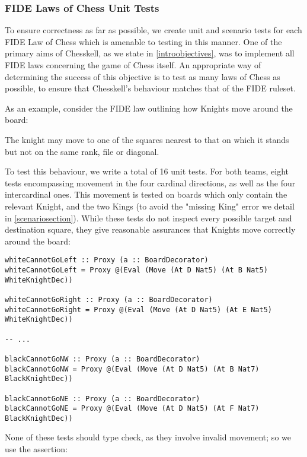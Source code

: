 \subsubsection{FIDE Laws of Chess Unit Tests}

To ensure correctness as far as possible, we create unit and scenario tests for each FIDE Law of Chess which is amenable to testing in this manner. One of the primary aims of Chesskell, as we state in \cref{introobjectives}, was to implement all FIDE laws concerning the game of Chess itself. An appropriate way of determining the success of this objective is to test as many laws of Chess as possible, to ensure that Chesskell's behaviour matches that of the FIDE ruleset.

As an example, consider the FIDE law outlining how Knights move around the board:

\begin{quoting}
    The knight may move to one of the squares nearest to that on which it stands but not on the same rank, file or diagonal.
\end{quoting}

To test this behaviour, we write a total of 16 unit tests. For both teams, eight tests encompassing movement in the four cardinal directions, as well as the four intercardinal ones. This movement is tested on boards which only contain the relevant Knight, and the two Kings (to avoid the "missing King" error we detail in \cref{scenariosection}). While these tests do not inspect every possible target and destination square, they give reasonable assurances that Knights move correctly around the board:

\begin{lstlisting}
whiteCannotGoLeft :: Proxy (a :: BoardDecorator)
whiteCannotGoLeft = Proxy @(Eval (Move (At D Nat5) (At B Nat5) WhiteKnightDec))

whiteCannotGoRight :: Proxy (a :: BoardDecorator)
whiteCannotGoRight = Proxy @(Eval (Move (At D Nat5) (At E Nat5) WhiteKnightDec))

-- ...

blackCannotGoNW :: Proxy (a :: BoardDecorator)
blackCannotGoNW = Proxy @(Eval (Move (At D Nat5) (At B Nat7) BlackKnightDec))

blackCannotGoNE :: Proxy (a :: BoardDecorator)
blackCannotGoNE = Proxy @(Eval (Move (At D Nat5) (At F Nat7) BlackKnightDec))
\end{lstlisting}

None of these tests should type check, as they involve invalid movement; so we use the  assertion:

